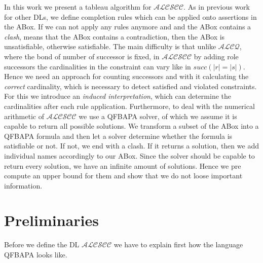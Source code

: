 \documentclass{book}
\theoremstyle{break}
\theoremstyle{definition}
\begin{document}
In this work we present a tableau algorithm for $\mathcal{ALCSCC}$. As in previous work for other DLs, we define completion rules which can be applied onto assertions in the ABox. If we can not apply any rules anymore and and the ABox contains a \textit{clash}, means that the ABox contains a contradiction, then the ABox is unsatisfiable, otherwise satisfiable. The main difficulty is that unlike $\mathcal{ALCQ}$, where the bond of number of successor is fixed, in $\mathcal{ALCSCC}$ by adding role successors the cardinalities in the constraint can vary like in $succ(|r|=|s|)$. Hence we need an approach for counting successors and with it calculating the \textit{correct} cardinality, which is necessary to detect satisfied and violated constraints. For this we introduce an \textit{induced interpretation}, which can determine the cardinalities after each rule application. Furthermore, to deal with the numerical arithmetic of $\mathcal{ALCSCC}$ we use a QFBAPA solver, of which we assume it is capable to return all possible solutions. We transform a subset of the ABox into a QFBAPA formula and then let a solver determine whether the formula is satisfiable or not. If not, we end with a clash. If it returns a solution, then we add individual names accordingly to our ABox. Since the solver should be capable to return every solution, we have an infinite amount of solutions. Hence we pre compute an upper bound for them and show that we do not loose important information.
\chapter{Preliminaries}
Before we define the DL $\mathcal{ALCSCC}$ we have to explain first how the language QFBAPA looks like. 
\end{document}
